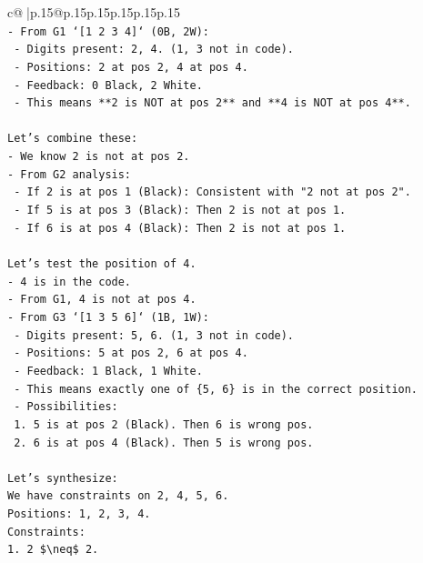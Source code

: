 \documentclass{article}
\begin{document}
{\begin{supertabular}{c@{$\;$}|p{.15\linewidth}@{}p{.15\linewidth}p{.15\linewidth}p{.15\linewidth}p{.15\linewidth}p{.15\linewidth}}
{{{\\ 
\texttt{{-} From G1 `{[}1 2 3 4{]}` (0B, 2W):} \\
\texttt{    {-} Digits present: 2, 4. (1, 3 not in code).} \\
\texttt{    {-} Positions: 2 at pos 2, 4 at pos 4.} \\
\texttt{    {-} Feedback: 0 Black, 2 White.} \\
\texttt{    {-} This means **2 is NOT at pos 2** and **4 is NOT at pos 4**.} \\
\\ 
\texttt{Let's combine these:} \\
\texttt{{-} We know 2 is not at pos 2.} \\
\texttt{{-} From G2 analysis:} \\
\texttt{    {-} If 2 is at pos 1 (Black): Consistent with "2 not at pos 2".} \\
\texttt{    {-} If 5 is at pos 3 (Black): Then 2 is not at pos 1.} \\
\texttt{    {-} If 6 is at pos 4 (Black): Then 2 is not at pos 1.} \\
\\ 
\texttt{Let's test the position of 4.} \\
\texttt{{-} 4 is in the code.} \\
\texttt{{-} From G1, 4 is not at pos 4.} \\
\texttt{{-} From G3 `{[}1 3 5 6{]}` (1B, 1W):} \\
\texttt{    {-} Digits present: 5, 6. (1, 3 not in code).} \\
\texttt{    {-} Positions: 5 at pos 2, 6 at pos 4.} \\
\texttt{    {-} Feedback: 1 Black, 1 White.} \\
\texttt{    {-} This means exactly one of \{5, 6\} is in the correct position.} \\
\texttt{    {-} Possibilities:} \\
\texttt{        1. 5 is at pos 2 (Black). Then 6 is wrong pos.} \\
\texttt{        2. 6 is at pos 4 (Black). Then 5 is wrong pos.} \\
\\ 
\texttt{Let's synthesize:} \\
\texttt{We have constraints on 2, 4, 5, 6.} \\
\texttt{Positions: 1, 2, 3, 4.} \\
\texttt{Constraints:} \\
\texttt{1.  2 \$\textbackslash{}neq\$ 2.} \\
}}}
\end{supertabular}}
\end{document}
